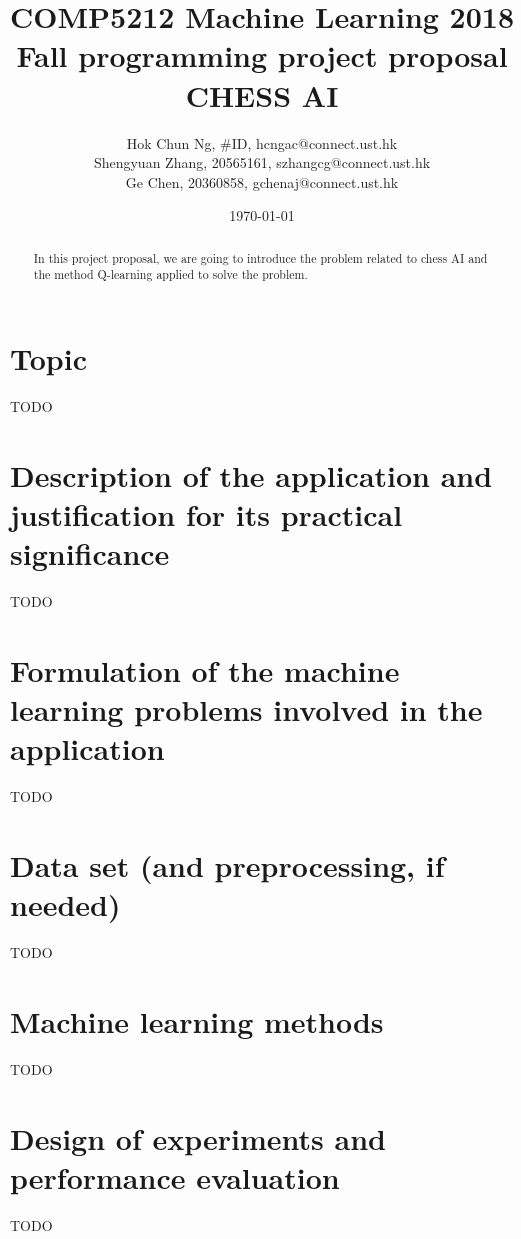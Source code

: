 \documentclass[a4paper]{article}
\title{COMP5212 Machine Learning 2018 Fall programming project proposal \\ CHESS AI}
\author{Hok Chun Ng, \#ID, hcngac@connect.ust.hk \\
        Shengyuan Zhang, 20565161, szhangcg@connect.ust.hk \\
        Ge Chen, 20360858, gchenaj@connect.ust.hk}
\date{\today}
\begin{document}
\maketitle

\begin{abstract}
In this project proposal, we are going to introduce the
problem related to chess AI and the method Q-learning applied
to solve the problem.
\end{abstract}

\section{Topic}

TODO


\section{Description of the application and justification for its practical significance}

TODO

\section{Formulation of the machine learning problems involved in the application}

TODO

\section{Data set (and preprocessing, if needed)}

TODO

\section{Machine learning methods}

TODO

\section{Design of experiments and performance evaluation}

TODO



%
\end{document}
